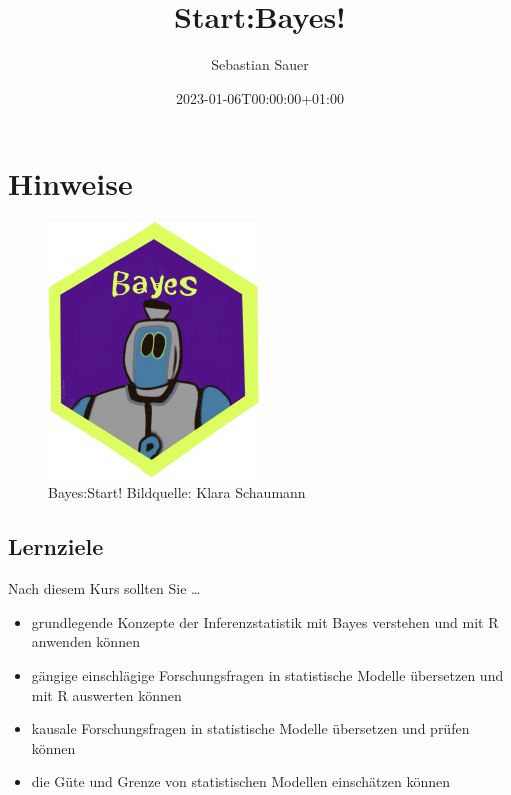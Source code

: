 \documentclass[
  a4paper,
  DIV=11]{scrreprt}
\title{Start:Bayes!}
\author{Sebastian Sauer}
\date{2023-01-06T00:00:00+01:00}
\providecommand{\tightlist}{%
  \setlength{\itemsep}{0pt}\setlength{\parskip}{0pt}}\usepackage{longtable,booktabs,array}
\renewcommand*\contentsname{Inhaltsverzeichnis}
\newcommand\contentsname{Inhaltsverzeichnis}
\theoremstyle{definition}
\theoremstyle{remark}
\begin{document}
\maketitle
\ifdefined\Shaded\renewenvironment{Shaded}{\begin{tcolorbox}[sharp corners, borderline west={3pt}{0pt}{shadecolor}, breakable, frame hidden, boxrule=0pt, interior hidden, enhanced]}{\end{tcolorbox}}\fi

\renewcommand*\contentsname{Inhaltsverzeichnis}
{
\hypersetup{linkcolor=}
\setcounter{tocdepth}{2}
\tableofcontents
}

\hypertarget{hinweise}{%
\chapter*{Hinweise}\label{hinweise}}

\begin{figure}

{\centering \includegraphics[width=0.5\textwidth,height=\textheight]{./img/Golem_hex.png}

}

\caption{Bayes:Start! Bildquelle: Klara Schaumann}

\end{figure}

\hypertarget{lernziele}{%
\section*{Lernziele}\label{lernziele}}

Nach diesem Kurs sollten Sie \ldots{}

\begin{itemize}
\tightlist
\item
  grundlegende Konzepte der Inferenzstatistik mit Bayes verstehen und
  mit R anwenden können
\item
  gängige einschlägige Forschungsfragen in statistische Modelle
  übersetzen und mit R auswerten können
\item
  kausale Forschungsfragen in statistische Modelle übersetzen und prüfen
  können
\item
  die Güte und Grenze von statistischen Modellen einschätzen können
\end{itemize}
\end{document}
